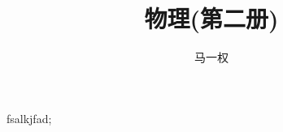\documentclass{book}
\title{物理(第二册)}
\author{马一权}
\begin{document}
    \maketitle


    \begin{yq_content}
        \newpage
        fsalkjfad;
        \newpage
    \end{yq_content}
\end{document}
